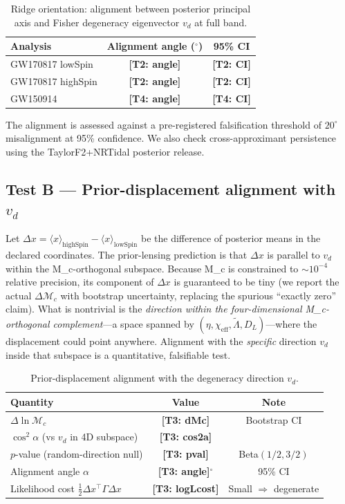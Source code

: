\documentclass[twocolumn,prd,showpacs,superscriptaddress]{revtex4-2}
\newcommand{\Mchirp}{\mathcal{M}_c}
\newcommand{\Lambdatilde}{\tilde{\Lambda}}
\newcommand{\chieff}{\chi_{\text{eff}}}
\newcommand{\Dl}{D_L}
\newcommand{\vd}{v_{d}}          %
\newcommand{\manifest}[1]{\textbf{[#1]}}
\begin{document}
\begin{table}[tp]
\centering
\renewcommand{\arraystretch}{1.2}
\caption{Ridge orientation: alignment between posterior principal axis and Fisher degeneracy eigenvector $\vd$ at full band.}
\label{tab:ridge_orientation}
\begin{tabular}{lcc}
\toprule
Analysis & Alignment angle ($^\circ$) & 95\% CI \\
\midrule
GW170817 lowSpin & \manifest{T2: angle} & \manifest{T2: CI} \\
GW170817 highSpin & \manifest{T2: angle} & \manifest{T2: CI} \\
GW150914 & \manifest{T4: angle} & \manifest{T4: CI} \\
\bottomrule
\end{tabular}
\end{table}

The alignment is assessed against a pre-registered falsification threshold of $20^\circ$ misalignment at 95\% confidence. We also check cross-approximant persistence using the TaylorF2+NRTidal posterior release.

\subsection{Test B --- Prior-displacement alignment with $\vd$}

Let $\Delta x = \langle x \rangle_{\text{highSpin}} - \langle x \rangle_{\text{lowSpin}}$ be the difference of posterior means in the declared coordinates. The prior-lensing prediction is that $\Delta x$ is parallel to $\vd$ within the M_c-orthogonal subspace. Because M_c is constrained to $\sim10^{-4}$ relative precision, its component of $\Delta x$ is guaranteed to be tiny (we report the actual $\Delta\Mchirp$ with bootstrap uncertainty, replacing the spurious ``exactly zero'' claim). What is nontrivial is the \emph{direction within the four-dimensional M_c-orthogonal complement}---a space spanned by $(\eta, \chieff, \Lambdatilde, \Dl)$---where the displacement could point anywhere. Alignment with the \emph{specific} direction $\vd$ inside that subspace is a quantitative, falsifiable test.

\begin{table}[tp]
\centering
\renewcommand{\arraystretch}{1.2}
\caption{Prior-displacement alignment with the degeneracy direction $\vd$.}
\label{tab:displacement}
\begin{tabular}{lcc}
\toprule
Quantity & Value & Note \\
\midrule
$\Delta \ln\Mchirp$ & \manifest{T3: dMc} & Bootstrap CI \\
$\cos^2\alpha$ (vs $\vd$ in 4D subspace) & \manifest{T3: cos2a} & \\
$p$-value (random-direction null) & \manifest{T3: pval} & Beta$(1/2, 3/2)$ \\
Alignment angle $\alpha$ & \manifest{T3: angle}$^\circ$ & 95\% CI \\
Likelihood cost $\tfrac12 \Delta x^\top \Gamma \Delta x$ & \manifest{T3: logLcost} & Small $\Rightarrow$ degenerate \\
\bottomrule
\end{tabular}
\end{table}
\end{document}
